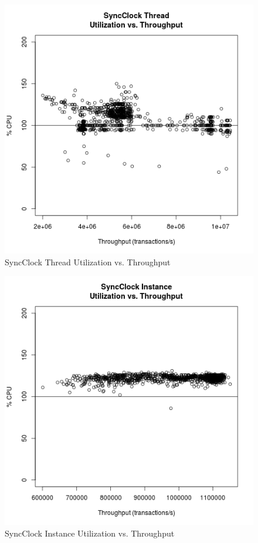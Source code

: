\begin{figure}[H]
\center
\includegraphics[height=.4\textheight]{sync_thread_throughput_utilization.png}
\caption{SyncClock Thread Utilization vs. Throughput}
\label{sync_thread_throughput_utilization}
\end{figure}

\begin{figure}[H]
\center
\includegraphics[height=.4\textheight]{sync_instance_throughput_utilization.png}
\caption{SyncClock Instance Utilization vs. Throughput}
\label{sync_instance_throughput_utilization}
\end{figure}

